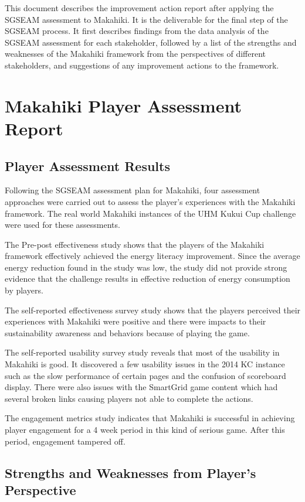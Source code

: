 
This document describes the improvement action report after applying the SGSEAM assessment to Makahiki. It is the deliverable for the final step of the SGSEAM process. It first describes findings from the data analysis of the SGSEAM assessment for each stakeholder, followed by a list of the strengths and weaknesses of the Makahiki framework from the perspectives of different stakeholders, and suggestions of any improvement actions to the framework.

\section{Makahiki Player Assessment Report}

\subsection{Player Assessment Results}

Following the SGSEAM assessment plan for Makahiki, four assessment approaches were carried out to assess the player's experiences with the Makahiki framework. The real world Makahiki instances of the UHM Kukui Cup challenge were used for these assessments. 

The Pre-post effectiveness study shows that the players of the Makahiki framework effectively achieved the energy literacy improvement. Since the average energy reduction found in the study was low, the study did not provide strong evidence that the challenge results in effective reduction of energy consumption by players. 

The self-reported effectiveness survey study shows that the players perceived their experiences with Makahiki were positive and there were impacts to their sustainability awareness and behaviors because of playing the game. 

The self-reported usability survey study reveals that most of the usability in Makahiki is good. It discovered a few usability issues in the 2014 KC instance such as the slow performance of certain pages and the confusion of scoreboard display. There were also issues with the SmartGrid game content which had several broken links causing players not able to complete the actions. 

The engagement metrics study indicates that Makahiki is successful in achieving player engagement for a 4 week period in this kind of serious game. After this period, engagement tampered off. 

\subsection{Strengths and Weaknesses from Player's Perspective}


